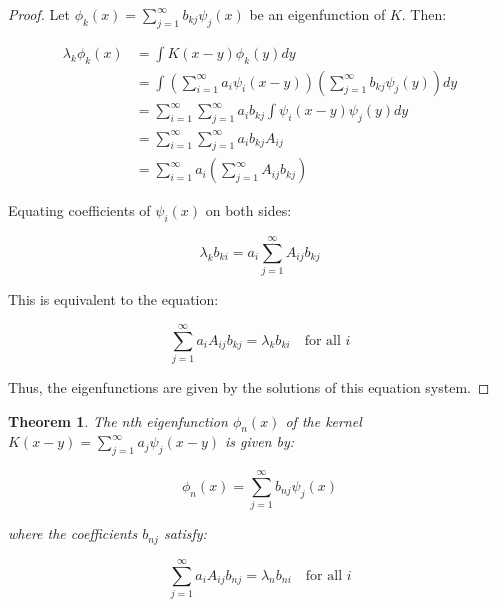 \documentclass{article}
\newtheorem{theorem}{Theorem}
\begin{document}
\begin{proof}
Let $\phi_k(x) = \sum_{j=1}^{\infty} b_{kj} \psi_j(x)$ be an eigenfunction of $K$. Then:

\begin{align*}
\lambda_k \phi_k(x) &= \int K(x-y)\phi_k(y)dy \\
&= \int \left(\sum_{i=1}^{\infty} a_i \psi_i(x-y)\right) \left(\sum_{j=1}^{\infty} b_{kj} \psi_j(y)\right) dy \\
&= \sum_{i=1}^{\infty} \sum_{j=1}^{\infty} a_i b_{kj} \int \psi_i(x-y)\psi_j(y)dy \\
&= \sum_{i=1}^{\infty} \sum_{j=1}^{\infty} a_i b_{kj} A_{ij} \\
&= \sum_{i=1}^{\infty} a_i \left(\sum_{j=1}^{\infty} A_{ij} b_{kj}\right)
\end{align*}

Equating coefficients of $\psi_i(x)$ on both sides:

\[\lambda_k b_{ki} = a_i \sum_{j=1}^{\infty} A_{ij} b_{kj}\]

This is equivalent to the equation:

\[\sum_{j=1}^{\infty} a_i A_{ij} b_{kj} = \lambda_k b_{ki} \quad \text{for all } i\]

Thus, the eigenfunctions are given by the solutions of this equation system.
\end{proof}

\begin{theorem}
The nth eigenfunction $\phi_n(x)$ of the kernel $K(x-y) = \sum_{j=1}^{\infty} a_j \psi_j(x-y)$ is given by:

\[\phi_n(x) = \sum_{j=1}^{\infty} b_{nj} \psi_j(x)\]

where the coefficients $b_{nj}$ satisfy:

\[\sum_{j=1}^{\infty} a_i A_{ij} b_{nj} = \lambda_n b_{ni} \quad \text{for all } i\]
\end{theorem}
\end{document}

